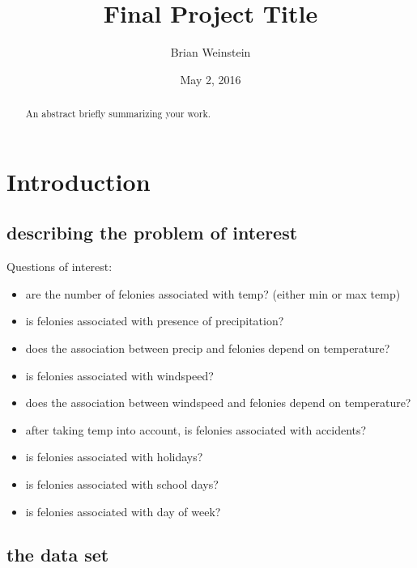 \documentclass[12pt,notitlepage]{article}
\begin{document}
\title{Final Project Title}
\author{Brian Weinstein}
\date{May 2, 2016}

\maketitle



\begin{abstract}
\singlespacing
An abstract briefly summarizing your work.
\end{abstract}



\pagebreak

\singlespacing



\section{Introduction}


\subsection{describing the problem of interest}

Questions of interest:
\begin{itemize}
\item are the number of felonies associated with temp? (either min or max temp)
\item is felonies associated with presence of precipitation?
\item does the association between precip and felonies depend on temperature?
\item is felonies associated with windspeed?
\item does the association between windspeed and felonies depend on temperature?
\item after taking temp into account, is felonies associated with accidents?
\item is felonies associated with holidays?
\item is felonies associated with school days?
\item is felonies associated with day of week?
\end{itemize}


\subsection{the data set}
\end{document}
